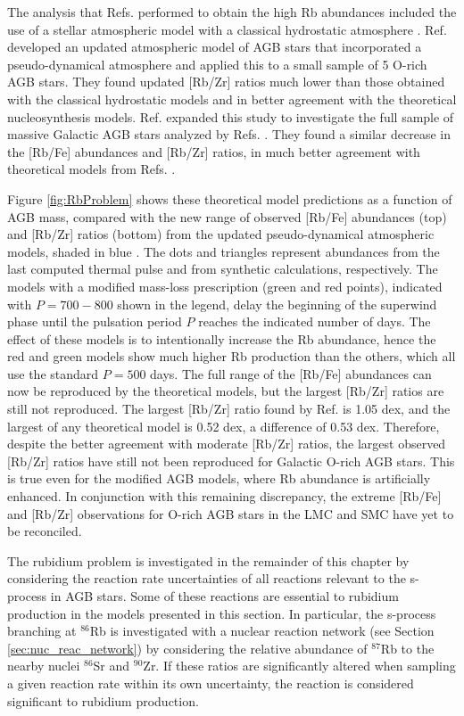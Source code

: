 The analysis that Refs. \cite{Garcia2006,Garcia2007,Garcia2009} performed to obtain the high Rb abundances included the use of a stellar atmospheric model with a classical hydrostatic atmosphere \cite{Gustafsson2008}. Ref. \cite{Zamora2014} developed an updated atmospheric model of AGB stars that incorporated a pseudo-dynamical atmosphere and applied this to a small sample of 5 O-rich AGB stars. They found updated [Rb/Zr] ratios much lower than those obtained with the classical hydrostatic models and in better agreement with the theoretical nucleosynthesis models. Ref. \cite{Perez2017} expanded this study to investigate the full sample of massive Galactic AGB stars analyzed by Refs. \cite{Garcia2006,Garcia2007}. They found a similar decrease in the [Rb/Fe] abundances and [Rb/Zr] ratios, in much better agreement with theoretical models from Refs. \cite{Karakas2012,Raa2012,Karakas2016,Pignatari2016}. 

Figure \ref{fig:RbProblem} shows these theoretical model predictions as a function of AGB mass, compared with the new range of observed [Rb/Fe] abundances (top) and [Rb/Zr] ratios (bottom) from the updated pseudo-dynamical atmospheric models, shaded in blue \cite{Perez2017}. The dots and triangles represent abundances from the last computed thermal pulse and from synthetic calculations, respectively. The models with a modified mass-loss prescription (green and red points), indicated with $P=700-800$ shown in the legend, delay the beginning of the superwind phase until the pulsation period $P$ reaches the indicated number of days. The effect of these models is to intentionally increase the Rb abundance, hence the red and green models show much higher Rb production than the others, which all use the standard $P=500$ days. The full range of the [Rb/Fe] abundances can now be reproduced by the theoretical models, but the largest [Rb/Zr] ratios are still not reproduced. The largest [Rb/Zr] ratio found by Ref. \cite{Perez2017} is 1.05 dex, and the largest of any theoretical model is 0.52 dex, a difference of 0.53 dex. Therefore, despite the better agreement with moderate [Rb/Zr] ratios, the largest observed [Rb/Zr] ratios have still not been reproduced for Galactic O-rich AGB stars. This is true even for the modified AGB models, where Rb abundance is artificially enhanced. In conjunction with this remaining discrepancy, the extreme [Rb/Fe] and [Rb/Zr] observations for O-rich AGB stars in the LMC and SMC \cite{Garcia2009} have yet to be reconciled.

The rubidium problem is investigated in the remainder of this chapter by considering the reaction rate uncertainties of all reactions relevant to the s-process in AGB stars. Some of these reactions are essential to rubidium production in the models presented in this section. In particular, the s-process branching at $^{86}$Rb is investigated with a nuclear reaction network (see Section \ref{sec:nuc_reac_network}) by considering the relative abundance of $^{87}$Rb to the nearby nuclei $^{86}$Sr and $^{90}$Zr. If these ratios are significantly altered when sampling a given reaction rate within its own uncertainty, the reaction is considered significant to rubidium production.

